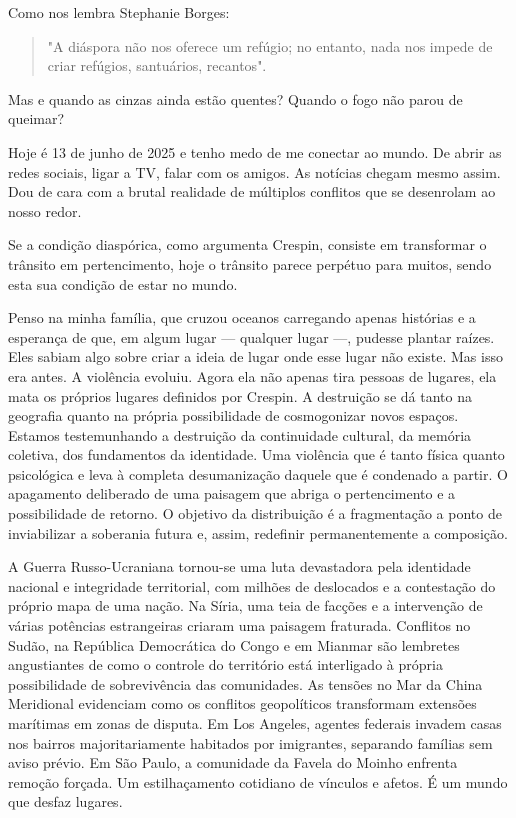 Como nos lembra Stephanie Borges:

\begin{quote}
"A diáspora não nos oferece um refúgio; no entanto, nada nos impede de
criar refúgios, santuários, recantos".
\end{quote}

Mas e quando as cinzas ainda estão quentes? Quando o fogo não parou de
queimar?

Hoje é 13 de junho de 2025 e tenho medo de me conectar ao mundo. De
abrir as redes sociais, ligar a TV, falar com os amigos. As notícias
chegam mesmo assim. Dou de cara com a brutal realidade de múltiplos
conflitos que se desenrolam ao nosso redor.

Se a condição diaspórica, como argumenta Crespin, consiste em
transformar o trânsito em pertencimento, hoje o trânsito parece perpétuo
para muitos, sendo esta sua condição de estar no mundo.

Penso na minha família, que cruzou oceanos carregando apenas histórias e
a esperança de que, em algum lugar --- qualquer lugar ---, pudesse
plantar raízes. Eles sabiam algo sobre criar a ideia de lugar onde esse
lugar não existe. Mas isso era antes. A violência evoluiu. Agora ela não
apenas tira pessoas de lugares, ela mata os próprios lugares definidos
por Crespin. A destruição se dá tanto na geografia quanto na própria
possibilidade de cosmogonizar novos espaços. Estamos testemunhando a
destruição da continuidade cultural, da memória coletiva, dos
fundamentos da identidade. Uma violência que é tanto física quanto
psicológica e leva à completa desumanização daquele que é condenado a
partir. O apagamento deliberado de uma paisagem que abriga o
pertencimento e a possibilidade de retorno. O objetivo da distribuição é
a fragmentação a ponto de inviabilizar a soberania futura e, assim,
redefinir permanentemente a composição.

A Guerra Russo-Ucraniana tornou-se uma luta devastadora pela identidade
nacional e integridade territorial, com milhões de deslocados e a
contestação do próprio mapa de uma nação. Na Síria, uma teia de facções
e a intervenção de várias potências estrangeiras criaram uma paisagem
fraturada. Conflitos no Sudão, na República Democrática do Congo e em
Mianmar são lembretes angustiantes de como o controle do território está
interligado à própria possibilidade de sobrevivência das comunidades. As
tensões no Mar da China Meridional evidenciam como os conflitos
geopolíticos transformam extensões marítimas em zonas de disputa. Em Los
Angeles, agentes federais invadem casas nos bairros majoritariamente
habitados por imigrantes, separando famílias sem aviso prévio. Em São
Paulo, a comunidade da Favela do Moinho enfrenta remoção forçada. Um
estilhaçamento cotidiano de vínculos e afetos. É um mundo que desfaz
lugares.

